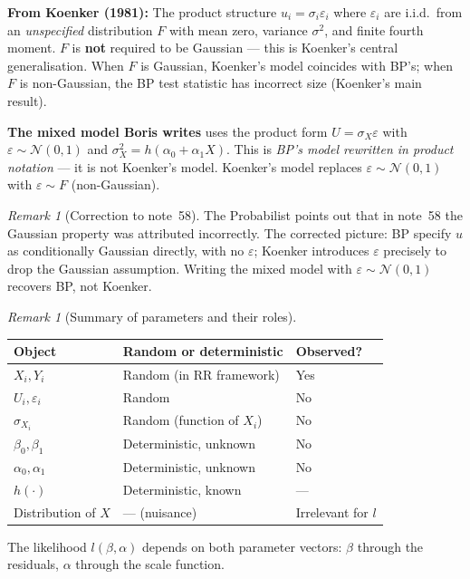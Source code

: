 \documentclass[a4paper,oneside,12pt]{extarticle}
\theoremstyle{plain}
\theoremstyle{definition}
\theoremstyle{remark}
\newtheorem{remark}[proposition]{Remark}
\begin{document}
\textbf{From Koenker (1981):} The product structure $u_i = \sigma_i
\varepsilon_i$ where $\varepsilon_i$ are i.i.d.\ from an
\emph{unspecified} distribution $F$ with mean zero, variance $\sigma^2$,
and finite fourth moment.  $F$ is \textbf{not} required to be Gaussian
--- this is Koenker's central generalisation.  When $F$ is Gaussian,
Koenker's model coincides with BP's; when $F$ is non-Gaussian, the
BP test statistic has incorrect size (Koenker's main result).

\textbf{The mixed model Boris writes} uses the product form
$U = \sigma_X \varepsilon$ with $\varepsilon \sim \mathcal{N}(0,1)$
and $\sigma_X^2 = h(\alpha_0 + \alpha_1 X)$.  This is \emph{BP's model
rewritten in product notation} --- it is not Koenker's model.
Koenker's model replaces $\varepsilon \sim \mathcal{N}(0,1)$ with
$\varepsilon \sim F$ (non-Gaussian).

\begin{remark}[Correction to note~58]
The Probabilist points out that in note~58 the Gaussian property was attributed
incorrectly.  The corrected picture: BP specify $u$ as conditionally
Gaussian directly, with no $\varepsilon$; Koenker introduces $\varepsilon$
precisely to drop the Gaussian assumption.  Writing the mixed model with
$\varepsilon \sim \mathcal{N}(0,1)$ recovers BP, not Koenker.
\end{remark}

\begin{remark}[Summary of parameters and their roles]
\begin{center}
\small
\begin{tabular}{lll}
\toprule
Object & Random or deterministic & Observed? \\
\midrule
$X_i, Y_i$ & Random (in RR framework) & Yes \\
$U_i, \varepsilon_i$ & Random & No \\
$\sigma_{X_i}$ & Random (function of $X_i$) & No \\
$\beta_0, \beta_1$ & Deterministic, unknown & No \\
$\alpha_0, \alpha_1$ & Deterministic, unknown & No \\
$h(\cdot)$ & Deterministic, known & --- \\
Distribution of $X$ & --- (nuisance) & Irrelevant for $l$ \\
\bottomrule
\end{tabular}
\end{center}
The likelihood $l(\beta,\alpha)$ depends on both parameter vectors:
$\beta$ through the residuals, $\alpha$ through the scale function.
\end{remark}
\end{document}
